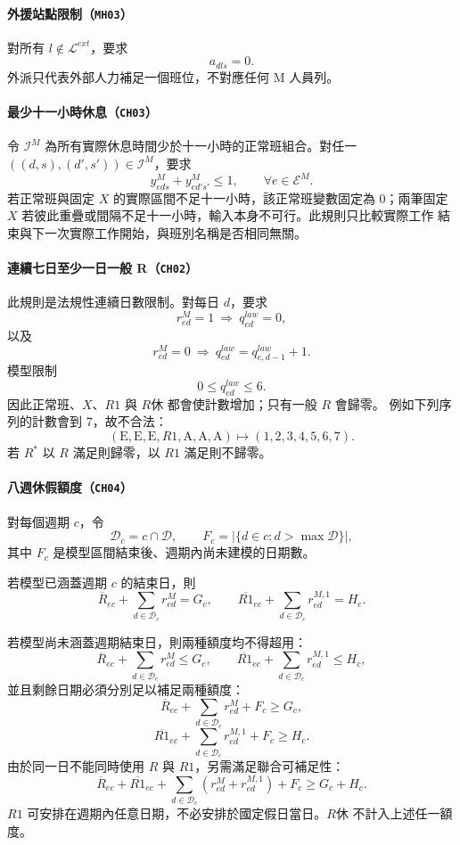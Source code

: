 \documentclass[a4paper,12pt]{article}
\begin{document}
\paragraph{外援站點限制（\texttt{MH03}）}
對所有 \(l\notin\mathcal{L}^{ext}\)，要求
\[
  a_{dls}=0.
\]
外派只代表外部人力補足一個班位，不對應任何 M 人員列。

\paragraph{最少十一小時休息（\texttt{CH03}）}
令 \(\mathcal{I}^{M}\) 為所有實際休息時間少於十一小時的正常班組合。對任一
\(((d,s),(d',s'))\in\mathcal{I}^{M}\)，要求
\[
  y^{M}_{eds}+y^{M}_{ed's'}\leq1,
  \qquad
  \forall e\in\mathcal{E}^{M}.
\]
若正常班與固定 \(X\) 的實際區間不足十一小時，該正常班變數固定為 0；兩筆固定
\(X\) 若彼此重疊或間隔不足十一小時，輸入本身不可行。此規則只比較實際工作
結束與下一次實際工作開始，與班別名稱是否相同無關。

\paragraph{連續七日至少一日一般 R（\texttt{CH02}）}
此規則是法規性連續日數限制。對每日 \(d\)，要求
\[
  r^{M}_{ed}=1
  \ \Longrightarrow\ 
  q^{law}_{ed}=0,
\]
以及
\[
  r^{M}_{ed}=0
  \ \Longrightarrow\ 
  q^{law}_{ed}=q^{law}_{e,d-1}+1.
\]
模型限制
\[
  0\leq q^{law}_{ed}\leq6.
\]
因此正常班、\(X\)、\(R1\) 與 \(R休\) 都會使計數增加；只有一般 \(R\) 會歸零。
例如下列序列的計數會到 7，故不合法：
\[
  (\mathrm{E},\mathrm{E},\mathrm{E},R1,\mathrm{A},\mathrm{A},\mathrm{A})
  \longmapsto (1,2,3,4,5,6,7).
\]
若 \(R^*\) 以 \(R\) 滿足則歸零，以 \(R1\) 滿足則不歸零。

\paragraph{八週休假額度（\texttt{CH04}）}
對每個週期 \(c\)，令
\[
  \mathcal{D}_c=c\cap\mathcal{D},
  \qquad
  F_c=\left|\{d\in c:d>\max\mathcal{D}\}\right|,
\]
其中 \(F_c\) 是模型區間結束後、週期內尚未建模的日期數。

若模型已涵蓋週期 \(c\) 的結束日，則
\[
  \overline{R}_{ec}
  +\sum_{d\in\mathcal{D}_c}r^{M}_{ed}
  =G_c,
  \qquad
  \overline{R1}_{ec}
  +\sum_{d\in\mathcal{D}_c}r^{M,1}_{ed}
  =H_c.
\]

若模型尚未涵蓋週期結束日，則兩種額度均不得超用：
\[
  \overline{R}_{ec}+\sum_{d\in\mathcal{D}_c}r^{M}_{ed}\leq G_c,
  \qquad
  \overline{R1}_{ec}+\sum_{d\in\mathcal{D}_c}r^{M,1}_{ed}\leq H_c,
\]
並且剩餘日期必須分別足以補足兩種額度：
\[
  \overline{R}_{ec}+\sum_{d\in\mathcal{D}_c}r^{M}_{ed}+F_c\geq G_c,
\]
\[
  \overline{R1}_{ec}+\sum_{d\in\mathcal{D}_c}r^{M,1}_{ed}+F_c\geq H_c.
\]
由於同一日不能同時使用 \(R\) 與 \(R1\)，另需滿足聯合可補足性：
\[
  \overline{R}_{ec}+\overline{R1}_{ec}
  +\sum_{d\in\mathcal{D}_c}\left(r^{M}_{ed}+r^{M,1}_{ed}\right)
  +F_c
  \geq G_c+H_c.
\]
\(R1\) 可安排在週期內任意日期，不必安排於國定假日當日。\(R休\) 不計入上述任一額度。
\end{document}
